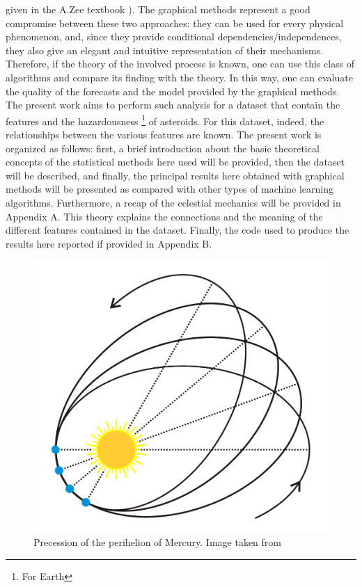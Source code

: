 \documentclass[12pt,%
               a4paper,%
               oneside,openany,%
               titlepage,%
               headinclude,footinclude,%
               BCOR5mm,%
               cleardoublepage=empty,%
               tablecaptionabove,%
               floatperchapter,
               ]{scrreprt}                 %
\begin{document}
given in the A.Zee textbook \cite{zee2013einstein}). The graphical methods represent a good compromise between these two approaches: they can be used for every physical phenomenon, and, since they provide conditional dependencies/independences, they also give an elegant and intuitive representation of their mechanisms. Therefore, if the theory of the involved process is known, one can use this class of algorithms and compare its finding with the theory. In this way, one can evaluate the quality of the forecasts and the model provided by the graphical methods. The present work aims to perform such analysis for a dataset that contain the features and the hazardousness \footnote{For Earth} of asteroids. For this dataset, indeed, the relationships between the various features are known. The present work is organized as follows: first, a brief introduction about the basic theoretical concepts of the statistical methods here used will be provided, then the dataset will be described, and finally, the principal results here obtained with graphical methods will be presented as compared with other types of machine learning algorithms. Furthermore, a recap of the celestial mechanics will be provided in Appendix A. This theory explains the connections and the meaning of the different features contained in the dataset. Finally, the code used to produce the results here reported if provided in Appendix B.




\begin{figure}[h]
\begin{center}
\includegraphics[width=1\textwidth]{Figures/Perihelion_precession2.png}
\caption{Precession of the perihelion of Mercury. Image taken from \cite{Perihelion_precession}}
\label{Perihelion_precession2}
\end{center}
\end{figure}
\end{document}
